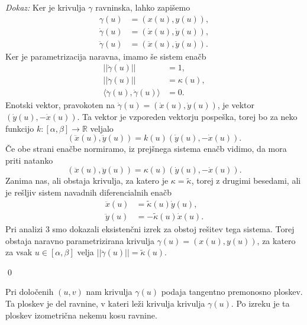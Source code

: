 {\em Dokaz:\/}
 Ker je krivulja $\gamma$ ravninska, lahko zapišemo 
 \begin{align*}
     \gamma(u) &= (x(u), y(u)), \\
     \dot{\gamma}(u) &= (\dot{x}(u), \dot{y}(u)), \\ 
     \ddot{\gamma}(u) &= (\ddot{x}(u), \ddot{y}(u)).
 \end{align*}
 Ker je parametrizacija naravna, imamo še sistem enačb
 \begin{align*}
  \lvert\lvert \dot{\gamma}(u) \rvert\rvert &= 1,   \\
  \lvert\lvert \ddot{\gamma}(u) \rvert\rvert &= \kappa(u) ,   \\
    \langle \ddot{\gamma}(u), \dot{\gamma}(u) \rangle   &= 0.
 \end{align*}
 Enotski vektor, pravokoten na $\dot{\gamma}(u) = (\dot{x}(u), \dot{y}(u))$, je vektor $(\dot{y}(u), -\dot{x}(u))$. Ta vektor je vzporeden vektorju pospeška,
 torej bo za neko funkcijo $k : [\alpha, \beta]  \to \mathbb{R}$ veljalo 
 \begin{equation*} (\ddot{x}(u), \ddot{y}(u)) = k(u) (\dot{y}(u), -\dot{x}(u)). \end{equation*}Če obe strani enačbe normiramo, iz prejšnega sistema enačb vidimo, da mora priti natanko 
 \begin{equation*} (\ddot{x}(u), \ddot{y}(u)) = \kappa(u) (\dot{y}(u), -\dot{x}(u)).\end{equation*}Zanima nas, ali obstaja krivulja, za katero je $\kappa = \tilde{\kappa}$, torej z drugimi besedami, ali je rešljiv sistem navadnih diferencialnih enačb 
 \begin{align*}
     \ddot{x}(u) &= \tilde{\kappa}(u) \dot{y}(u), \\
     \ddot{y}(u) &= -\tilde{\kappa}(u) \dot{x}(u).
 \end{align*}
Pri analizi 3 smo dokazali eksistenčni izrek za obstoj rešitev tega sistema. Torej obstaja
naravno parametrizirana krivulja $\gamma(u) = (x(u), y(u))$, za katero za vsak $u \in [\alpha, \beta]$ velja $\lvert\lvert \ddot{\gamma}(u) \rvert\rvert = \tilde{\kappa}(u)$.

\qed

\begin{opomba}
 Pri določenih $(u,v)$ nam krivulja $\gamma(u)$ podaja tangentno premonosno ploskev. Ta ploskev je del ravnine, v kateri
 leži krivulja krivulja $\gamma(u)$. Po izreku \href{izr_izometricnost_ploskev_ravnini} je ta ploskev izometrična nekemu kosu ravnine.
\end{opomba}

